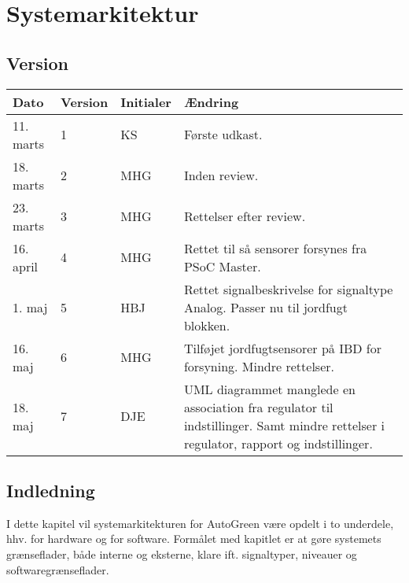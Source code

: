 \chapter{Systemarkitektur} \label{ch:SysArk}

\section*{Version}
\begin{table}[h]
	\centering
	\begin{tabularx}{\textwidth - 2cm}{|l|l|l|X|}
	\hline
	Dato	& Version	& Initialer & Ændring	\\ \hline
	11. marts & 1 & KS & Første udkast. \\ \hline
	18. marts & 2 & MHG & Inden review. \\\hline
	23. marts & 3 & MHG & Rettelser efter review. \\\hline		
	16. april & 4 & MHG & Rettet til så \IIC sensorer forsynes fra PSoC Master. \\\hline 
	1. maj & 5 & HBJ & Rettet signalbeskrivelse for signaltype Analog. Passer nu til jordfugt blokken. \\\hline
	16. maj & 6 & MHG & Tilføjet jordfugtsensorer på IBD for forsyning. Mindre rettelser. \\\hline
	18. maj & 7 & DJE & UML diagrammet manglede en association fra regulator til indstillinger. Samt mindre rettelser i regulator, rapport og indstillinger. \\\hline
	\end{tabularx}
\end{table}

\section{Indledning}

I dette kapitel vil systemarkitekturen for AutoGreen være opdelt i to underdele, hhv. for hardware og for software. Formålet med kapitlet er at gøre systemets grænseflader, både interne og eksterne, klare ift. signaltyper, niveauer og softwaregrænseflader.








